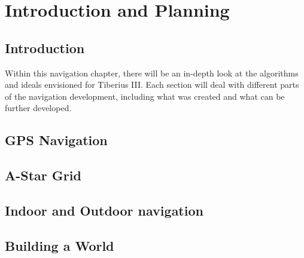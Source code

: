 \section{Introduction and Planning}

\subsection{Introduction}
Within this navigation chapter, there will be an in-depth look at the algorithms and ideals envisioned for Tiberius III. Each section will deal with different parts of the navigation development, including what was created and what can be further developed.
\newline

\subsection{GPS Navigation}

\subsection{A-Star Grid}

\subsection{Indoor and Outdoor navigation}

\subsection{Building a World}